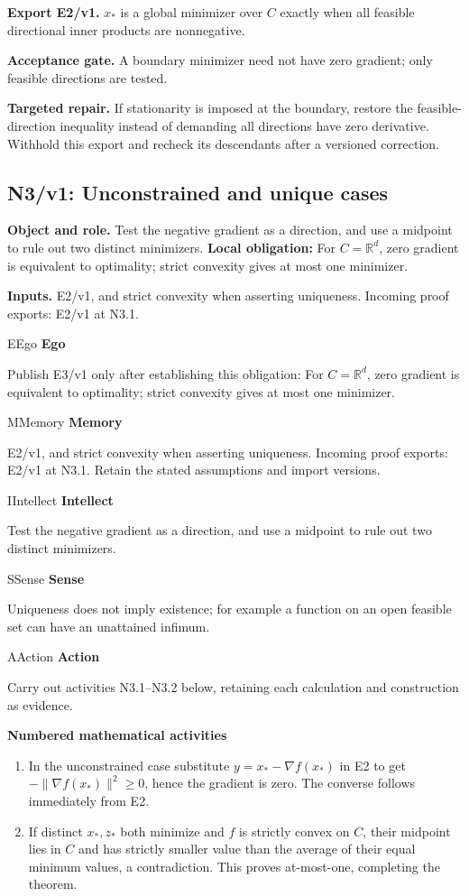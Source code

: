 \documentclass[preprint,12pt,aps,pra,showkeys,amsmath,amssymb,superscriptaddress,floatfix]{revtex4-2}
\theoremstyle{definition}
\theoremstyle{remark}
\newcommand{\mmfaculty}[3]{%
 \begin{mmfacultybox}{#1}{#2}
 {\sffamily\bfseries\color{MMBlue}#2}\par\smallskip #3
 \end{mmfacultybox}}
\newcommand{\field}[2]{\par\smallskip\noindent\textbf{#1.} #2\par}
\begin{document}
\field{Export E2/v1}{\(x_*\) is a global minimizer over \(C\) exactly when all feasible
directional inner products are nonnegative.}

\field{Acceptance gate}{A boundary minimizer need not have zero gradient; only feasible
directions are tested.}

\field{Targeted repair}{If stationarity is imposed at the boundary, restore the
feasible-direction inequality instead of demanding all directions have
zero derivative. Withhold this export and recheck its descendants after
a versioned correction.}

\clearpage

\subsection{N3/v1: Unconstrained and unique cases}

\field{Object and role}{Test the negative gradient as a direction, and use a midpoint to rule
out two distinct minimizers. \textbf{Local obligation:} For
\(C=\mathbb R^d\), zero gradient is equivalent to optimality; strict
convexity gives at most one minimizer.}

\field{Inputs}{E2/v1, and strict convexity when asserting uniqueness. Incoming proof
exports: E2/v1 at N3.1.}

\mmfaculty{E}{Ego}{Publish E3/v1 only after establishing this obligation: For
\(C=\mathbb R^d\), zero gradient is equivalent to optimality; strict
convexity gives at most one minimizer.}

\mmfaculty{M}{Memory}{E2/v1, and strict convexity when asserting uniqueness. Incoming proof
exports: E2/v1 at N3.1. Retain the stated assumptions and import
versions.}

\mmfaculty{I}{Intellect}{Test the negative gradient as a direction, and use a midpoint to rule
out two distinct minimizers.}

\mmfaculty{S}{Sense}{Uniqueness does not imply existence; for example a function on an open
feasible set can have an unattained infimum.}

\mmfaculty{A}{Action}{Carry out activities N3.1--N3.2 below, retaining each calculation and
construction as evidence.}

\smallskip\noindent\textbf{Numbered mathematical activities}

\begin{enumerate}[label=N3.\arabic*,leftmargin=3.4em]

\item In the unconstrained case substitute \(y=x_*-\nabla f(x_*)\) in E2 to
get \(-\|\nabla f(x_*)\|^2\ge0\), hence the gradient is zero. The
converse follows immediately from E2.

\item If distinct \(x_*,z_*\) both minimize and \(f\) is strictly convex on
\(C\), their midpoint lies in \(C\) and has strictly smaller value than
the average of their equal minimum values, a contradiction. This proves
at-most-one, completing the theorem.

\end{enumerate}
\end{document}

